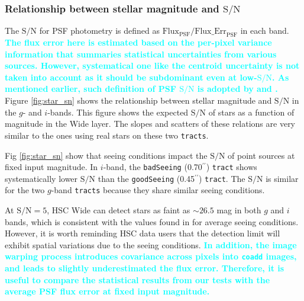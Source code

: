\documentclass[useamsfonts]{pasj01}
\def\asec{$^{\prime\prime}$}
\def\tract{\texttt{tract}}
\def\tracts{\texttt{tracts}}
\def\s2n{{$\mathrm{S}/\mathrm{N}$}}
\newcommand{\song}[1]{\textcolor{cyan} {\textbf{#1}}}
\begin{document}
\subsubsection{Relationship between stellar magnitude and \s2n{}}

    The \s2n{} for PSF photometry is defined as
    $\mathrm{Flux}_{\mathrm{PSF}}/\mathrm{Flux\_Err}_{\mathrm{PSF}}$ in each band. 
    \song{
    The flux error here is estimated based on the per-pixel variance information that
    summaries statistical uncertainties from various sources. 
    However, systematical one like the centroid uncertainty is not taken into account 
    as it should be subdominant even at low-\s2n{}. 
    As mentioned earlier, such definition of PSF \s2n{} is adopted by \citet{HSCDR1} 
    and \citet{Bosch2017}.
    }
    Figure \ref{fig:star_sn} shows the relationship between stellar magnitude and \s2n{} 
    in the $g$- and $i$-bands. 
    This figure shows the expected \s2n{} of stars as a function of magnitude in the 
    Wide layer.
    The slopes and scatters of these relations are very similar to the ones using 
    real stars on these two \tracts{}.
    
    Fig \ref{fig:star_sn} show that seeing conditions impact the \s2n{} of point
    sources at fixed input magnitude.
    In $i$-band, the \texttt{badSeeing} (0.70\asec{}) \tract{} shows systematically
    lower \s2n{} than the \texttt{goodSeeing} (0.45\asec{}) \tract{}.
    The \s2n{} is similar for the two $g$-band \tracts{} because they share similar 
    seeing conditions. 

    At \s2n{}$=5$, HSC Wide can detect stars as faint as ${\sim}26.5$ mag in both $g$ 
    and $i$ bands, which is consistent with the values found in \citet{HSCDR1} for 
    average seeing conditions.
    However, it is worth reminding HSC data users that the detection
    limit will exhibit spatial variations due to the seeing conditions.
    \song{
    In addition, the image warping process introduces covariance across pixels into 
    \texttt{coadd} images, and leads to slightly underestimated the flux error.  
    Therefore, it is useful to compare the statistical results from our tests with the 
    average PSF flux error at fixed input magnitude.  
    }
\end{document}
